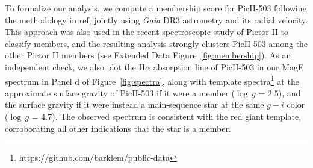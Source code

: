 \documentclass[pdflatex,sn-nature]{sn-jnl}%
\theoremstyle{thmstyleone}%
\theoremstyle{thmstyletwo}%
\theoremstyle{thmstylethree}%
\begin{document}
To formalize our analysis, we compute a membership score for PicII-503 following the methodology in ref\cite{tsa+23}, jointly using \textit{Gaia} DR3 astrometry and its radial velocity.
This approach was also used in the recent spectroscopic study of Pictor II\cite{pace+25} to classify members, and the resulting analysis strongly clusters PicII-503 among the other Pictor II members (see Extended Data Figure~\ref{fig:membership}). 
As an independent check, we also plot the H$\alpha$ absorption line of PicII-503 in our MagE spectrum in Panel d of Figure~\ref{fig:spectra}, along with template spectra\cite{bpo+00, bsa+02}\footnote{https://github.com/barklem/public-data} at the approximate surface gravity of PicII-503 if it were a member ($\log\,g$ = 2.5), and the surface gravity if it were instead a main-sequence star at the same $g-i$ color ($\log\,g$ = 4.7). 
The observed spectrum is consistent with the red giant template, corroborating all other indications that the star is a member. 
\end{document}
